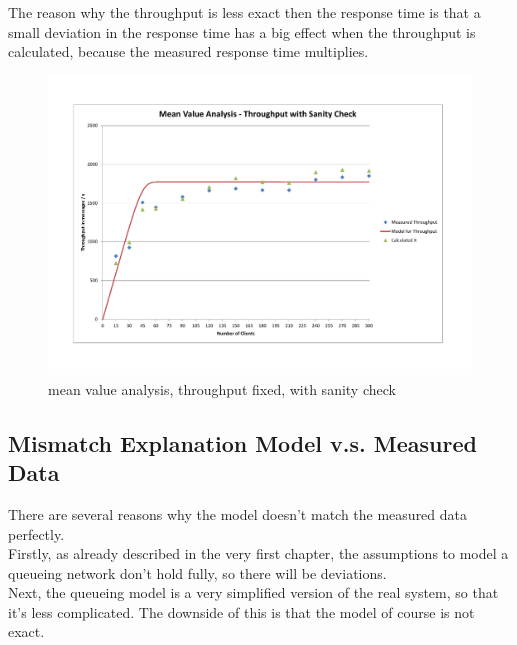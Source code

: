 \documentclass[a4paper]{article}
\begin{document}
The reason why the throughput is less exact then the response time is that a small deviation in the response time has a big effect when the throughput is calculated, because the measured response time multiplies.\\

\begin{landscape}\begin{figure}[H]
	\begin{center}
    \includegraphics[scale=0.7, trim = 23mm 28mm 24mm 25mm, clip]{measurements_increase_load/tp_sanity_check_total_fixed.pdf}
  \end{center}
  \caption{mean value analysis, throughput fixed, with sanity check}
  \label{fig:tp-sanity-check-total-fixed}
\end{figure}
\end{landscape}


\subsection{Mismatch Explanation Model v.s. Measured Data}

There are several reasons why the model doesn't match the measured data perfectly.\\

Firstly, as already described in the very first chapter, the assumptions to model a queueing network don't hold fully, so there will be deviations.\\

Next, the queueing model is a very simplified version of the real system, so that it's less complicated. The downside of this is that the model of course is not exact.\\
\end{document}

